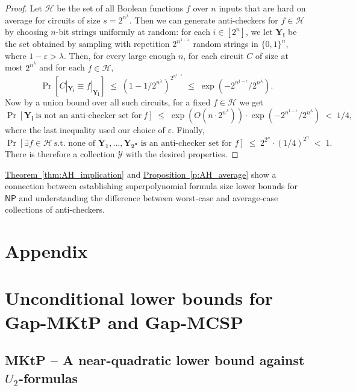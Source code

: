 \documentclass[11pt]{article}
\numberwithin{equation}{section}
\theoremstyle{definition}
\theoremstyle{plain}
\newcommand{\expref}[2]{\hyperref[#2]{#1~\ref{#2}}}
\begin{document}
\begin{proof}  Let $\mathcal{H}$ be the set of all Boolean functions $f$ over $n$ inputs that are hard on average for circuits of size $s = 2^{n^{\lambda}}$. Then we can generate anti-checkers for $f\in \mathcal{H}$ by choosing $n$-bit strings uniformly at random: for each $i \in [2^n]$, we let $\bm{Y_i}$ be the set obtained by sampling with repetition $2^{n^{1 - \varepsilon}}$ random strings in $\{0,1\}^n$, where $1 - \varepsilon > \lambda$. Then, for every large enough $n$, for each circuit $C$ of size at most $2^{n^\lambda}$ and for each $f \in \mathcal{H}$, 
$$\Pr[C|_{\bm{Y_i}}\equiv f|_{\bm{Y_i}}] \;\leq\; (1-1/2^{n^\lambda})^{2^{n^{1-\epsilon}}} \;\leq\; \exp(-2^{n^{1-\epsilon}}/2^{n^\lambda}).$$ 
Now by a union bound over all such circuits, for a fixed $f \in \mathcal{H}$ we get 
$$\Pr[\bm{Y_i}~\text{is not an anti-checker set for}~f] \;\leq\; \exp(O(n \cdot 2^{n^\lambda})) \cdot \exp(-2^{n^{1-\epsilon}}/2^{n^\lambda}) \;<\; 1/4,$$ where the last inequality used our choice of $\varepsilon$. Finally, $$\Pr[\exists f\in \mathcal{H}~\text{s.t.~none of~}\bm{Y_1},\dots,\bm{Y_{2^n}}\text{~is an anti-checker set for~}f] \;\leq\; 2^{2^n}\cdot (1/4)^{2^n} \;<\; 1.$$
There is therefore a collection $\mathcal{Y}$ with the desired properties.
\end{proof}

\expref{Theorem}{thm:AH_implication} and \expref{Proposition}{p:AH_average} show a connection between establishing superpolynomial formula size lower bounds for $\mathsf{NP}$ and understanding the  difference between worst-case and average-case collections of anti-checkers.






\section*{Appendix}



\section{Unconditional lower bounds for Gap-MKtP and Gap-MCSP}

\subsection{MKtP -- A near-quadratic lower bound against $U_2$-formulas}\label{ss:quadratic}
\end{document}
